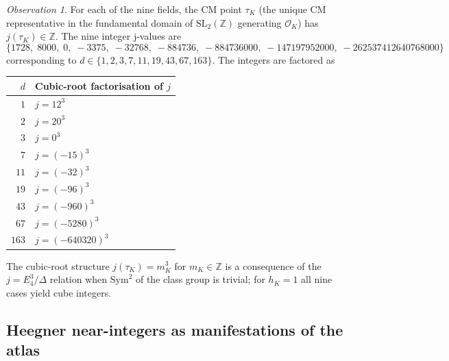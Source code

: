 \documentclass[11pt]{amsart}
\theoremstyle{plain}
\theoremstyle{definition}
\theoremstyle{remark}
\newtheorem*{observation}{Observation}
\newcommand{\Z}{\mathbb{Z}}
\begin{document}
\begin{observation}\label{obs:j-invariants}
For each of the nine fields, the CM point $\tau_K$ (the unique CM
representative in the fundamental domain of $\mathrm{SL}_2(\Z)$ generating
$\mathcal{O}_K$) has $j(\tau_K) \in \Z$. The nine integer j-values are
\[
\{1728,\; 8000,\; 0,\; -3375,\; -32768,\; -884736,\; -884736000,\; -147197952000,\; -262537412640768000\}
\]
corresponding to $d \in \{1, 2, 3, 7, 11, 19, 43, 67, 163\}$. The integers
are factored as
\begin{center}
\begin{tabular}{rl}
\toprule
$d$ & Cubic-root factorisation of $j$ \\
\midrule
$1$  & $j = 12^{3}$ \\
$2$  & $j = 20^{3}$ \\
$3$  & $j = 0^{3}$ \\
$7$  & $j = (-15)^{3}$ \\
$11$ & $j = (-32)^{3}$ \\
$19$ & $j = (-96)^{3}$ \\
$43$ & $j = (-960)^{3}$ \\
$67$ & $j = (-5280)^{3}$ \\
$163$ & $j = (-640320)^{3}$ \\
\bottomrule
\end{tabular}
\end{center}
The cubic-root structure $j(\tau_K) = m_K^{3}$ for $m_K \in \Z$ is a
consequence of the $j = E_{4}^{3}/\Delta$ relation when $\mathrm{Sym}^{2}$
of the class group is trivial; for $h_K = 1$ all nine cases yield cube
integers.
\end{observation}

\subsection{Heegner near-integers as manifestations of the atlas}
\end{document}
